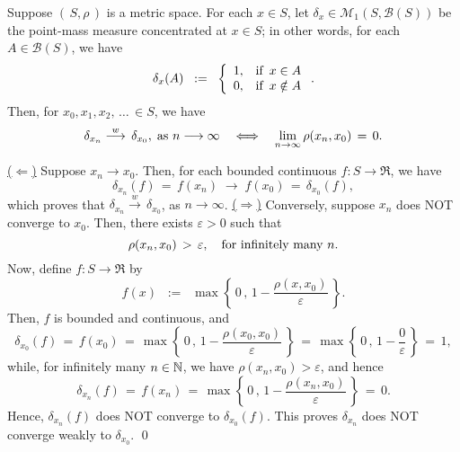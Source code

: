 \begin{lemma}
\label{WeakConvergenceOfPointMassMeasuresOnMetricSpaces}
\mbox{}\vskip 0.1cm
\noindent
Suppose $\left(\,S,\rho\,\right)$ is a metric space.
For each $x \in S$, let $\delta_{x} \in \mathcal{M}_{1}\!\left(S,\mathcal{B}(S)\right)$
be the point-mass measure concentrated at $x \in S$;
in other words, for each $A \in \mathcal{B}(S)$, we have
\begin{equation*}
\delta_{x}\!\left(A\right)
\;\; := \;\;
\left\{
\begin{array}{cl}
1, & \textnormal{if \,$x \in A$} \\
0, & \textnormal{if \,$x \notin A$}
\end{array}
\right..
\end{equation*}
Then, for $x_{0}, x_{1}, x_{2}, \,\ldots\, \in S$, we have
\begin{equation*}
\delta_{x_{n}}\overset{w}{\longrightarrow}\, \delta_{x_{0}},
\;\textnormal{as $n\longrightarrow\infty$}
\quad\Longleftrightarrow\quad
\lim_{n\rightarrow\infty}\rho\!\left( x_{n},x_{0} \right) \,=\, 0.
\end{equation*}
\end{lemma}
\proof
\vskip 0.1cm
\noindent
\underline{($\Longleftarrow$)}\quad
Suppose $x_{n} \longrightarrow x_{0}$.
Then, for each bounded continuous $f : S \longrightarrow \Re$, we have
\begin{equation*}
\delta_{x_{n}}(f) \,=\, f(x_{n}) \;\longrightarrow\; f(x_{0}) \,=\, \delta_{x_{0}}(f),
\end{equation*}
which proves that $\delta_{x_{n}}\overset{w}{\longrightarrow}\,\delta_{x_{0}}$,
as $n \longrightarrow \infty$. 
\vskip 0.3cm
\noindent
\underline{($\Longrightarrow$)}\quad
Conversely, suppose $x_{n}$ does NOT converge to $x_{0}$.
Then, there exists $\varepsilon > 0$ such that
\begin{equation*}
\rho(x_{n},x_{0}) \,>\, \varepsilon,
\quad\textnormal{for infinitely many $n$}. 
\end{equation*}
Now, define $f : S \longrightarrow \Re$ by
\begin{equation*}
f(x) \;\; := \;\; \max\!\left\{\,0\,,\,1 - \dfrac{\rho(x,x_{0})}{\varepsilon}\,\right\}.
\end{equation*}
Then, $f$ is bounded and continuous, and
\begin{equation*}
\delta_{x_{0}}(f)
\,=\, f(x_{0})
\,=\, \max\!\left\{\,0\,,\,1 - \dfrac{\rho(x_{0},x_{0})}{\varepsilon}\,\right\}
\,=\, \max\!\left\{\,0\,,\,1 - \dfrac{0}{\varepsilon}\,\right\}
\,=\, 1,
\end{equation*}
while, for infinitely many $n \in \mathbb{N}$, we have $\rho(x_{n},x_{0}) > \varepsilon$, and hence
\begin{equation*}
\delta_{x_{n}}(f)
\,=\, f(x_{n})
\,=\, \max\!\left\{\,0\,,\,1 - \dfrac{\rho(x_{n},x_{0})}{\varepsilon}\,\right\}
\,=\, 0.
\end{equation*}
Hence, $\delta_{x_{n}}(f)$ does NOT converge to $\delta_{x_{0}}(f)$.
This proves $\delta_{x_{n}}$ does NOT converge weakly to $\delta_{x_{0}}$.
\qed

